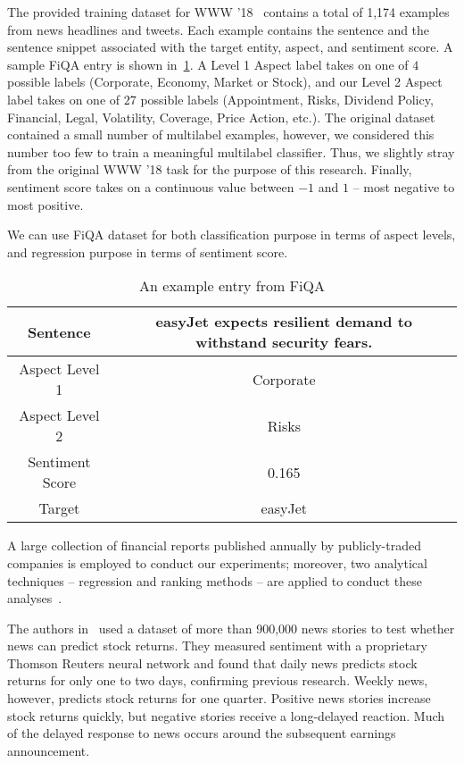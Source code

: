 \documentclass[11pt]{article}
\begin{document}
The provided training dataset for WWW ’18~\cite{maia2018} contains a total of 1,174 examples from news headlines and tweets. Each example contains the sentence and the sentence snippet
associated with the target entity, aspect, and sentiment score. A
sample FiQA entry is shown in~\ref{tab:fiqa_example}. A Level 1 Aspect
label takes on one of $4$ possible labels (Corporate, Economy, Market or Stock), and our Level 2 Aspect label takes on
one of $27$ possible labels (Appointment, Risks, Dividend Policy, Financial, Legal, Volatility, Coverage, Price Action, etc.). The original
dataset contained a small number of multilabel examples, however, we considered this number
too few to train a meaningful multilabel classifier. Thus, we slightly
stray from the original WWW ’18 task for the purpose of this research. Finally, sentiment score takes on a continuous value between $-1$ and $1$ – most negative to most positive.

We can use FiQA dataset for both classification purpose in terms of aspect levels, and regression purpose in terms of sentiment score.

\begin{table}
  \begin{tabular}{|c|c|}
    \hline 
 Sentence & easyJet expects resilient demand to withstand security
            fears. \\ \hline
Aspect Level 1 &  Corporate \\ \hline 
Aspect Level 2 & Risks \\ \hline 
Sentiment Score & 0.165 \\ \hline 
Target & easyJet \\ \hline 
\end{tabular}
\caption{An example entry from FiQA}
\label{tab:fiqa_example}
\end{table}


A large collection of financial reports published annually by publicly-traded companies is employed to conduct our experiments;
moreover, two analytical techniques – regression and ranking methods –
are applied to conduct these analyses~\cite{xxx}.

The authors in~\cite{steven2017} used a dataset of more than 900,000 news stories to test
whether news can predict stock returns. They measured sentiment with a
proprietary Thomson Reuters neural network and found that daily news
predicts stock returns for only one to two days, confirming previous
research. Weekly news, however, predicts stock returns for one
quarter. Positive news stories increase stock returns quickly, but
negative stories receive a long-delayed reaction. Much of the delayed
response to news occurs around the subsequent earnings announcement.
\end{document}
